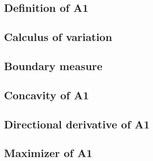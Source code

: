 
\subsection{Definition of A1}
\label{sec:definition-of-a1}


\subsection{Calculus of variation}
\label{sec:calculus-of-variation}


\subsection{Boundary measure}
\label{sec:boundary-measure}


\subsection{Concavity of A1}
\label{sec:concavity-of-a1}


\subsection{Directional derivative of A1}
\label{sec:directional-derivative-of-a1}


\subsection{Maximizer of A1}
\label{sec:maximizer-of-a1}


